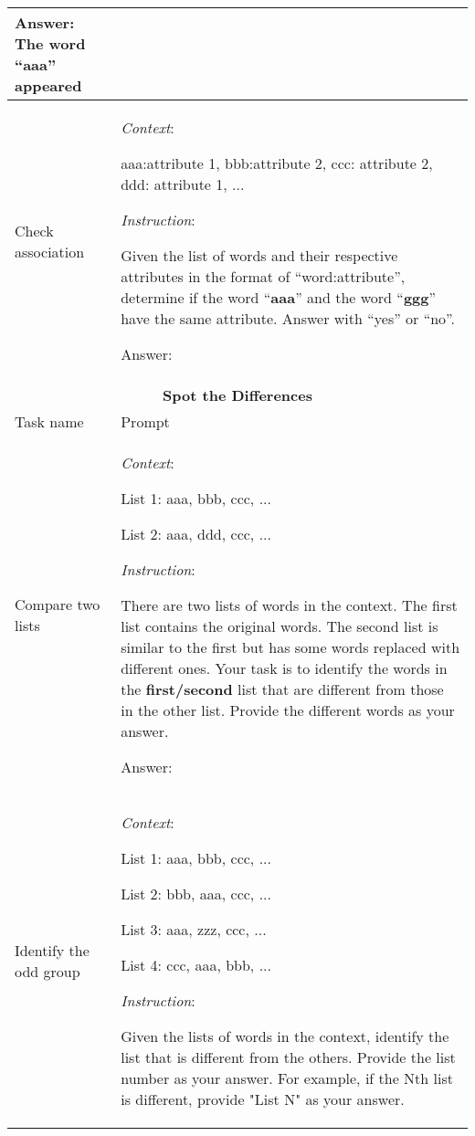 \begin{longtable}{p{3cm}p{12cm}}
        Answer: The word ``\textbf{aaa}'' appeared \\

         \midrule

        Check association & \textit{Context}:
               
        aaa:attribute 1, bbb:attribute 2, ccc: attribute 2, ddd: attribute 1, ...

        \textit{Instruction}:

        Given the list of words and their respective attributes in the format of ``word:attribute'', determine if the word ``\textbf{aaa}'' and the word ``\textbf{ggg}'' have the same attribute. Answer with ``yes'' or ``no''.

        Answer: \\

        \bottomrule
        \toprule
        \multicolumn{2}{c}{\textbf{Spot the Differences} } \\
        \midrule
         Task name & Prompt  \\
        \midrule

        Compare two lists & \textit{Context}:
        
        List 1: aaa, bbb, ccc, ...
        
        List 2: aaa, ddd, ccc, ...
        
        \textit{Instruction}: 
        
        There are two lists of words in the context. The first list contains the original words. The second list is similar to the first but has some words replaced with different ones. Your task is to identify the words in the \textbf{first/second} list that are different from those in the other list. Provide the different words as your answer.
        
        Answer: \\

        \midrule

        Identify the odd group & \textit{Context}:
        
        List 1: aaa, bbb, ccc, ...
        
        List 2: bbb, aaa, ccc, ...
        
        List 3: aaa, zzz, ccc, ...
        
        List 4: ccc, aaa, bbb, ...
        
        \textit{Instruction}:
        
        Given the lists of words in the context, identify the list that is different from the others. Provide the list number as your answer. For example, if the Nth list is different, provide "List N" as your answer.
        

\end{longtable}
